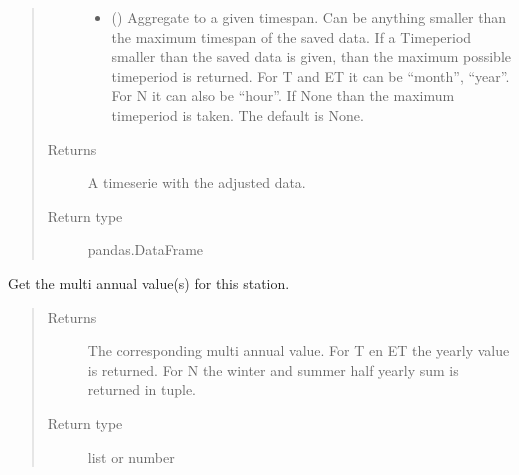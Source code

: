 \documentclass[letterpaper,10pt,english]{sphinxmanual}
\begin{document}
\begin{fulllineitems}
\begin{fulllineitems}
\begin{quote}
\begin{description}
\begin{itemize}
\item {} 
\sphinxAtStartPar
{} (\sphinxstyleliteralemphasis{\sphinxupquote{, }}) \textendash{} Aggregate to a given timespan.
Can be anything smaller than the maximum timespan of the saved data.
If a Timeperiod smaller than the saved data is given, than the maximum possible timeperiod is returned.
For T and ET it can be “month”, “year”.
For N it can also be “hour”.
If None than the maximum timeperiod is taken.
The default is None.

\end{itemize}

\item[{Returns}] \leavevmode
\sphinxAtStartPar
A timeserie with the adjusted data.

\item[{Return type}] \leavevmode
\sphinxAtStartPar
pandas.DataFrame

\end{description}\end{quote}

\end{fulllineitems}


\begin{fulllineitems}
\label{\detokenize{weatherDB:weatherDB.station.TemperatureStation.get_multi_annual}}
\sphinxAtStartPar
Get the multi annual value(s) for this station.
\begin{quote}\begin{description}
\item[{Returns}] \leavevmode
\sphinxAtStartPar
The corresponding multi annual value.
For T en ET the yearly value is returned.
For N the winter and summer half yearly sum is returned in tuple.

\item[{Return type}] \leavevmode
\sphinxAtStartPar
list or number

\end{description}\end{quote}

\end{fulllineitems}


\end{fulllineitems}
\end{document}
